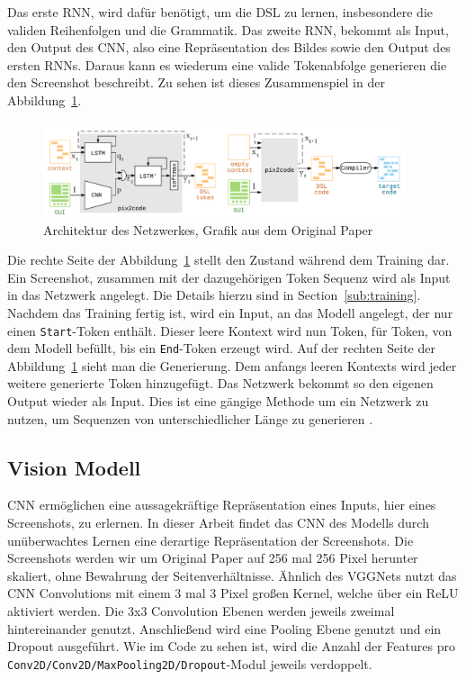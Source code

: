 \documentclass[pdftex,a4paper,halfparskip, article]{scrartcl}
\begin{document}
Das erste RNN, wird dafür benötigt, um die DSL zu lernen, insbesondere die validen Reihenfolgen und die Grammatik. Das zweite RNN, bekommt als Input, den Output des CNN, also eine Repräsentation des Bildes sowie den Output des ersten RNNs. Daraus kann es wiederum eine valide Tokenabfolge generieren die den Screenshot beschreibt. Zu sehen ist dieses Zusammenspiel in der Abbildung~\ref{fig:pix2code_paper_architecture}.

\begin{figure}[h]
\centering
\includegraphics[width=0.95\textwidth]{pix2code_paper_architecture}
\caption{Architektur des Netzwerkes, Grafik aus dem Original Paper \cite{Beltramelli17}}
\label{fig:pix2code_paper_architecture}
\end{figure}

Die rechte Seite der Abbildung~\ref{fig:pix2code_paper_architecture} stellt den Zustand während dem Training dar. Ein Screenshot, zusammen mit der dazugehörigen Token Sequenz wird als Input in das Netzwerk angelegt. Die Details hierzu sind in Section~\ref{sub:training}. Nachdem das Training fertig ist, wird ein Input, an das Modell angelegt, der nur einen \texttt{Start}-Token enthält. Dieser leere Kontext wird nun Token, für Token, von dem Modell befüllt, bis ein \texttt{End}-Token erzeugt wird. Auf der rechten Seite der Abbildung~\ref{fig:pix2code_paper_architecture} sieht man die Generierung. Dem anfangs leeren Kontexts wird jeder weitere generierte Token hinzugefügt. Das Netzwerk bekommt so den eigenen Output wieder als Input. Dies ist eine gängige Methode um ein Netzwerk zu nutzen, um Sequenzen von unterschiedlicher Länge zu generieren \cite{DBLP:journals/corr/Graves13}.

\subsection{Vision Modell}
 
CNN ermöglichen eine aussagekräftige Repräsentation eines Inputs, hier eines Screenshots, zu erlernen. In dieser Arbeit findet das CNN des Modells durch unüberwachtes Lernen eine derartige Repräsentation der Screenshots. Die Screenshots werden wir um Original Paper auf 256 mal 256 Pixel herunter skaliert, ohne Bewahrung der Seitenverhältnisse. Ähnlich des VGGNets \cite{DBLP:journals/corr/SimonyanZ14a} nutzt das CNN Convolutions mit einem 3 mal 3 Pixel großen Kernel, welche über ein ReLU aktiviert werden. Die 3x3 Convolution Ebenen werden jeweils zweimal hintereinander genutzt. Anschließend wird eine Pooling Ebene genutzt und ein Dropout ausgeführt. Wie im Code zu sehen ist, wird die Anzahl der Features pro \texttt{Conv2D/Conv2D/MaxPooling2D/Dropout}-Modul jeweils verdoppelt.
\end{document}
